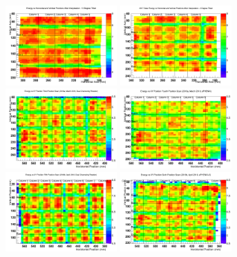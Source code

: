 \documentclass[hidelinks,11pt]{article}
\numberwithin{figure}{section}
\numberwithin{table}{section}
\begin{document}
\begin{figure}[hbtp]
\begin{center}
\includegraphics[width=0.38\textwidth]{Plots/InterMeanWithLine/Inter20172ndScan.png}
\includegraphics[width=0.38\textwidth]{Plots/InterMeanWithLine/Inter20173rdScan.png}
\includegraphics[width=0.38\textwidth]{Plots/2018NoInterMean/EnPo20183rdScan.png}
\includegraphics[width=0.38\textwidth]{Plots/2018NoInterMean/EnPo20184thScan.png}
\includegraphics[width=0.38\textwidth]{Plots/2018NoInterMean/EnPo20185thScan.png}
\includegraphics[width=0.38\textwidth]{Plots/2018NoInterMean/EnPo20186thScan.png}

\end{center}
\end{figure}
\end{document}
